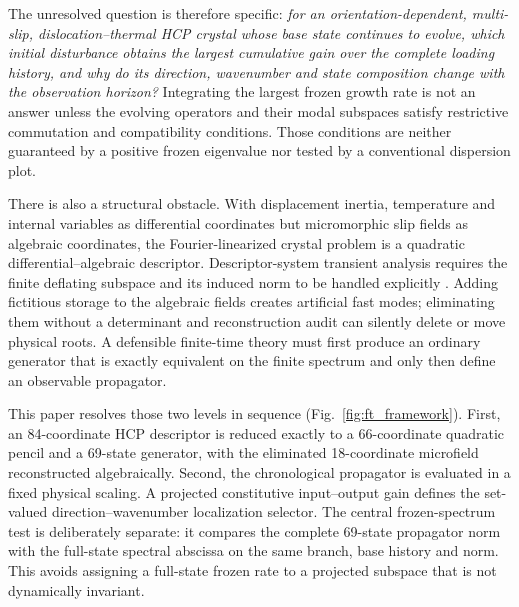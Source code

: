 The unresolved question is therefore specific: \emph{for an orientation-dependent, multi-slip, dislocation--thermal HCP crystal whose base state continues to evolve, which initial disturbance obtains the largest cumulative gain over the complete loading history, and why do its direction, wavenumber and state composition change with the observation horizon?} Integrating the largest frozen growth rate is not an answer unless the evolving operators and their modal subspaces satisfy restrictive commutation and compatibility conditions. Those conditions are neither guaranteed by a positive frozen eigenvalue nor tested by a conventional dispersion plot.

There is also a structural obstacle. With displacement inertia, temperature and internal variables as differential coordinates but micromorphic slip fields as algebraic coordinates, the Fourier-linearized crystal problem is a quadratic differential--algebraic descriptor. Descriptor-system transient analysis requires the finite deflating subspace and its induced norm to be handled explicitly \cite{EmbreeKeeler2017}. Adding fictitious storage to the algebraic fields creates artificial fast modes; eliminating them without a determinant and reconstruction audit can silently delete or move physical roots. A defensible finite-time theory must first produce an ordinary generator that is exactly equivalent on the finite spectrum and only then define an observable propagator.

This paper resolves those two levels in sequence (Fig.~\ref{fig:ft_framework}). First, an 84-coordinate HCP descriptor is reduced exactly to a 66-coordinate quadratic pencil and a 69-state generator, with the eliminated 18-coordinate microfield reconstructed algebraically. Second, the chronological propagator is evaluated in a fixed physical scaling. A projected constitutive input--output gain defines the set-valued direction--wavenumber localization selector. The central frozen-spectrum test is deliberately separate: it compares the complete 69-state propagator norm with the full-state spectral abscissa on the same branch, base history and norm. This avoids assigning a full-state frozen rate to a projected subspace that is not dynamically invariant.

